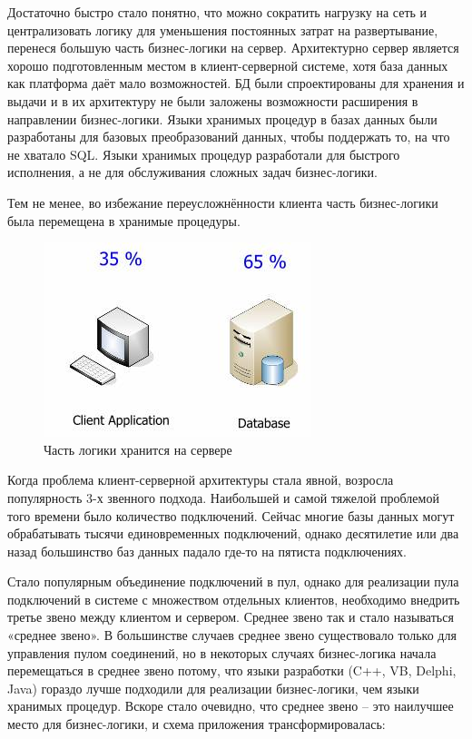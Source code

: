 \documentclass[14pt, a4paper]{extreport}
\begin{document}
Достаточно быстро стало понятно, что можно сократить нагрузку на сеть и централизовать логику для уменьшения постоянных затрат на развертывание, перенеся большую часть бизнес-логики на сервер. Архитектурно сервер является хорошо подготовленным местом в клиент-серверной системе, хотя база данных как платформа даёт мало возможностей. БД были спроектированы для хранения и выдачи и в их архитектуру не были заложены возможности расширения в направлении бизнес-логики. Языки хранимых процедур в базах данных были разработаны для базовых преобразований данных, чтобы поддержать то, на что не хватало SQL. Языки хранимых процедур разработали для быстрого исполнения, а не для обслуживания сложных задач бизнес-логики.

Тем не менее, во избежание переусложнённости клиента часть бизнес-логики была перемещена в хранимые процедуры.

\begin{figure}[!htb]
  \centering
    \includegraphics[scale=0.6]{../shared_images/business-logic/client-server-2.jpg}
   \caption{Часть логики хранится на сервере}
    \label{fig:start}
\end{figure}


Когда проблема клиент-серверной архитектуры стала явной, возросла популярность 3-х звенного подхода. Наибольшей и самой тяжелой проблемой того времени было количество подключений. Сейчас многие базы данных могут обрабатывать тысячи единовременных подключений, однако десятилетие или два назад большинство баз данных падало где-то на пятиста подключениях.

Стало популярным объединение подключений в пул, однако для реализации пула подключений в системе с множеством отдельных клиентов, необходимо внедрить третье звено между клиентом и сервером. Среднее звено так и стало называться «среднее звено». В большинстве случаев среднее звено существовало только для управления пулом соединений, но в некоторых случаях бизнес-логика начала перемещаться в среднее звено потому, что языки разработки (C++, VB, Delphi, Java) гораздо лучше подходили для реализации бизнес-логики, чем языки хранимых процедур. Вскоре стало очевидно, что среднее звено -- это наилучшее место для бизнес-логики, и схема приложения трансформировалась:
\end{document}

